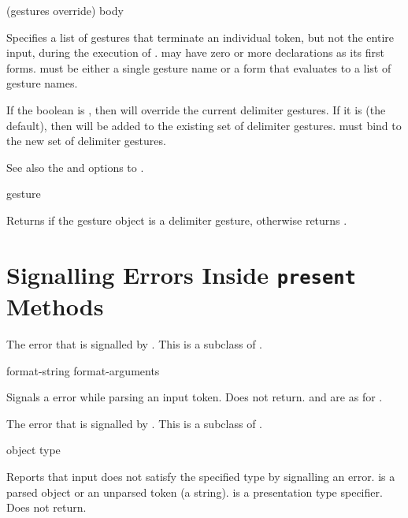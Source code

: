  {(gestures \key override) \body body}

Specifies a list of gestures that terminate an individual token, but not the
entire input, during the execution of .   may have zero or
more declarations as its first forms.   must be either a single
gesture name or a form that evaluates to a list of gesture names.

If the boolean  is , then  will override
the current delimiter gestures.  If it is  (the default), then
 will be added to the existing set of delimiter gestures.
 must bind  to the new set
of delimiter gestures.

See also the  and 
options to .

 {gesture}

Returns  if the gesture object  is a delimiter gesture,
otherwise returns .


\section {Signalling Errors Inside {\tt present} Methods}


The error that is signalled by .  This is a subclass of
.

 {format-string \rest format-arguments}

Signals a  error while parsing an input token.  Does not
return.   and  are as for .


The error that is signalled by .  This is a
subclass of .

 {object type}

Reports that input does not satisfy the specified type by signalling an
 error.   is a parsed object or an
unparsed token (a string).   is a presentation type specifier.  Does
not return.
 

